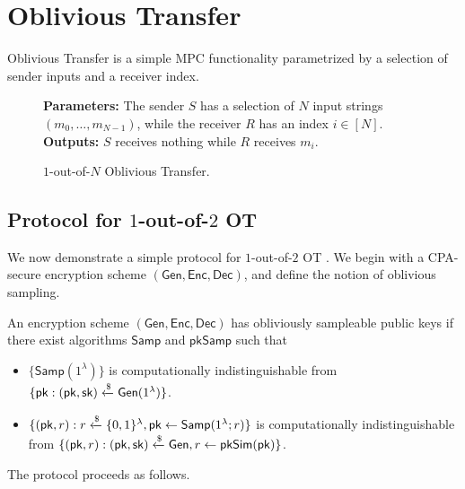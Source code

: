 \section{Oblivious Transfer}

Oblivious Transfer is a simple MPC functionality parametrized by a selection of sender inputs and a receiver index. 

\begin{figure}[h]
	\begin{mdframed}[
		linecolor=black,
		linewidth=1pt,
		roundcorner=5pt,
		backgroundcolor=white,
		userdefinedwidth=\textwidth,
		]
		\vspace{2mm}
		\textbf{Parameters:} The sender $S$ has a selection of $N$ input strings $(m_0,\dots,m_{N-1})$, while the receiver $R$ has an index $i\in[N]$.\\
		\textbf{Outputs:} $S$ receives nothing while $R$ receives $m_i$.
		\vspace{2mm}
	\end{mdframed}
	\caption{$1$-out-of-$N$ Oblivious Transfer.}
	\label{fig:OT}
\end{figure}

\subsection{Protocol for $1$-out-of-$2$ OT}

We now demonstrate a simple protocol for $1$-out-of-$2$ OT \cite{esgot}. We begin with a CPA-secure encryption scheme $(\mathsf{Gen},\mathsf{Enc},\mathsf{Dec})$, and define the notion of oblivious sampling.

\begin{definition}
	An \rarrow encryption scheme $(\mathsf{Gen},\mathsf{Enc},\mathsf{Dec})$ has obliviously sampleable public keys if there exist algorithms $\mathsf{Samp}$ and $\mathsf{pkSamp}$ such that 
	\begin{itemize}
		\item $\{\mathsf{Samp}(1^\lambda)\}$ is computationally indistinguishable from $\{\mathsf{pk}:(\mathsf{pk},\mathsf{sk})\xleftarrow{\$}\mathsf{Gen}(1^\lambda)\}$.
		\item $\{(\mathsf{pk},r):r\xleftarrow{\$}\{0,1\}^\lambda, \mathsf{pk}\leftarrow\mathsf{Samp}(1^\lambda;r)\}$ is computationally indistinguishable from $\{(\mathsf{pk},r):(\mathsf{pk},\mathsf{sk})\xleftarrow{\$}\mathsf{Gen}, r\gets\mathsf{pkSim}(\mathsf{pk})\}$.
	\end{itemize}
\end{definition}

The protocol proceeds as follows.

